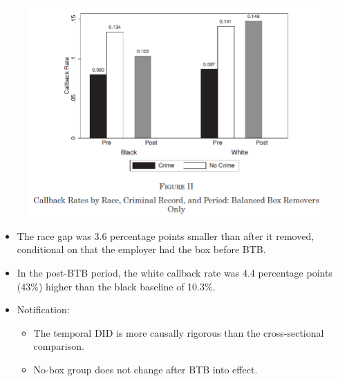 \documentclass[../root]{subfiles}
\begin{document}
    \begin{figure}[ht]
        \centering
        \includegraphics[scale = .8]{0925tanji/F2}
    \end{figure}

    \begin{itemize}
      \item The race gap was 3.6 percentage points smaller than after it removed, conditional on that the employer had the box before BTB.
      \item In the post-BTB period, the white callback rate was 4.4 percentage points (43\%) higher than the black baseline of 10.3\%.
      \item Notification:
      \begin{itemize}
        \item The temporal DID is more causally rigorous than the cross-sectional comparison.
        \item No-box group does not change after BTB into effect.
      \end{itemize}
    \end{itemize}
\end{document}
